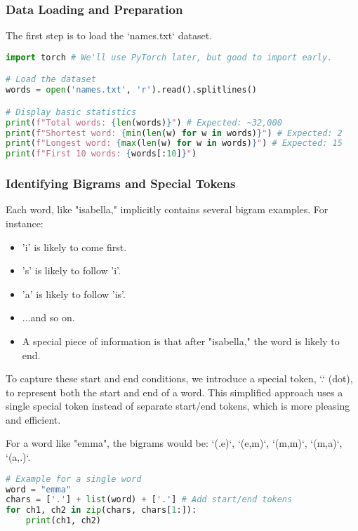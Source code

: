 \subsubsection{Data Loading and Preparation}
The first step is to load the `names.txt` dataset.

\begin{lstlisting}[language=Python, caption=Loading and preparing the dataset]
import torch # We'll use PyTorch later, but good to import early.

# Load the dataset
words = open('names.txt', 'r').read().splitlines()

# Display basic statistics
print(f"Total words: {len(words)}") # Expected: ~32,000
print(f"Shortest word: {min(len(w) for w in words)}") # Expected: 2
print(f"Longest word: {max(len(w) for w in words)}") # Expected: 15
print(f"First 10 words: {words[:10]}")
\end{lstlisting}

\subsubsection{Identifying Bigrams and Special Tokens}
Each word, like "isabella," implicitly contains several bigram examples. For instance:
\begin{itemize}
    \item 'i' is likely to come first.
    \item 's' is likely to follow 'i'.
    \item 'a' is likely to follow 'is'.
    \item ...and so on.
    \item A special piece of information is that after "isabella," the word is likely to end.
\end{itemize}

To capture these start and end conditions, we introduce a special token, `.` (dot), to represent both the start and end of a word. This simplified approach uses a single special token instead of separate start/end tokens, which is more pleasing and efficient.

For a word like "emma", the bigrams would be: `(.e)`, `(e,m)`, `(m,m)`, `(m,a)`, `(a,.)`.

\begin{lstlisting}[language=Python, caption=Extracting Bigrams from a word with special tokens]
# Example for a single word
word = "emma"
chars = ['.'] + list(word) + ['.'] # Add start/end tokens
for ch1, ch2 in zip(chars, chars[1:]):
    print(ch1, ch2)
\end{lstlisting}


